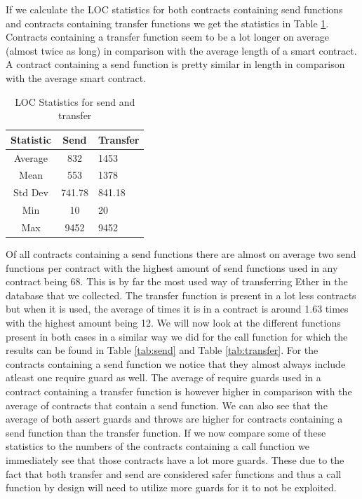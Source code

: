 \documentclass[10pt,conference]{IEEEtran}
\begin{document}
If we calculate the LOC statistics for both contracts containing send functions and contracts containing transfer functions we get the statistics in Table \ref{tab:loc}. Contracts containing a transfer function seem to be a lot longer on average (almost twice as long) in comparison with the average length of a smart contract. A contract containing a send function is pretty similar in length in comparison with the average smart contract.
\begin{table}
  \caption{LOC Statistics for send and transfer}
  \label{tab:loc}
  \begin{tabular}{ccl}
    \hline
    Statistic & Send & Transfer\\
    \hline
    Average&832&1453\\
    Mean&553&1378\\
    Std Dev&741.78&841.18\\
    Min&10&20\\
    Max&9452&9452\\
  \hline
\end{tabular}
\end{table}

Of all contracts containing a send functions there are almost on average two send functions per contract with the highest amount of send functions used in any contract being 68. This is by far the most used way of transferring Ether in the database that we collected. The transfer function is present in a lot less contracts but when it is used, the average of times it is in a contract is around 1.63 times with the highest amount being 12. 
We will now look at the different functions present in both cases in a similar way we did for the call function for which the results can be found in Table \ref{tab:send} and Table \ref{tab:transfer}. For the contracts containing a send function we notice that they almost always include atleast one require guard as well. The average of require guards used in a contract containing a transfer function is however higher in comparison with the average of contracts that contain a send function. We can also see that the average of both assert guards and throws are higher for contracts containing a send function than the transfer function. If we now compare some of these statistics to the numbers of the contracts containing a call function we immediately see that those contracts have a lot more guards. These due to the fact that both transfer and send are considered safer functions and thus a call function by design will need to utilize more guards for it to not be exploited.
\end{document}
